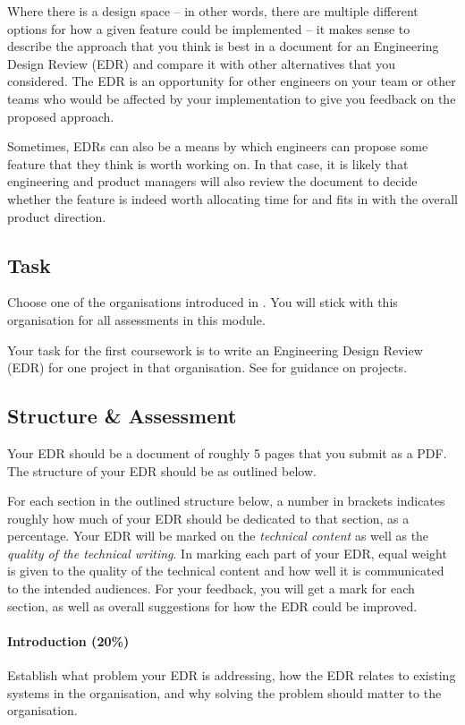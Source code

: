 Where there is a design space -- in other words, there are multiple different options for how a given feature could be implemented -- it makes sense to describe the approach that you think is best in a document for an Engineering Design Review (EDR) and compare it with other alternatives that you considered. The EDR is an opportunity for other engineers on your team or other teams who would be affected by your implementation to give you feedback on the proposed approach.

Sometimes, EDRs can also be a means by which engineers can propose some feature that they think is worth working on. In that case, it is likely that engineering and product managers will also review the document to decide whether the feature is indeed worth allocating time for and fits in with the overall product direction.

\subsection{Task}

Choose one of the organisations introduced in . You will stick with this organisation for all assessments in this module.

Your task for the first coursework is to write an Engineering Design Review (EDR) for one project in that organisation. See  for guidance on projects.

\subsection{Structure \& Assessment}

Your EDR should be a document of roughly 5 pages that you submit as a PDF. The structure of your EDR should be as outlined below.

For each section in the outlined structure below, a number in brackets indicates roughly how much of your EDR should be dedicated to that section, as a percentage. Your EDR will be marked on the \emph{technical content} as well as the \emph{quality of the technical writing}. In marking each part of your EDR, equal weight is given to the quality of the technical content and how well it is communicated to the intended audiences. For your feedback, you will get a mark for each section, as well as overall suggestions for how the EDR could be improved.

\paragraph{Introduction (20\%)} Establish what problem your EDR is addressing, how the EDR relates to existing systems in the organisation, and why solving the problem should matter to the organisation.

